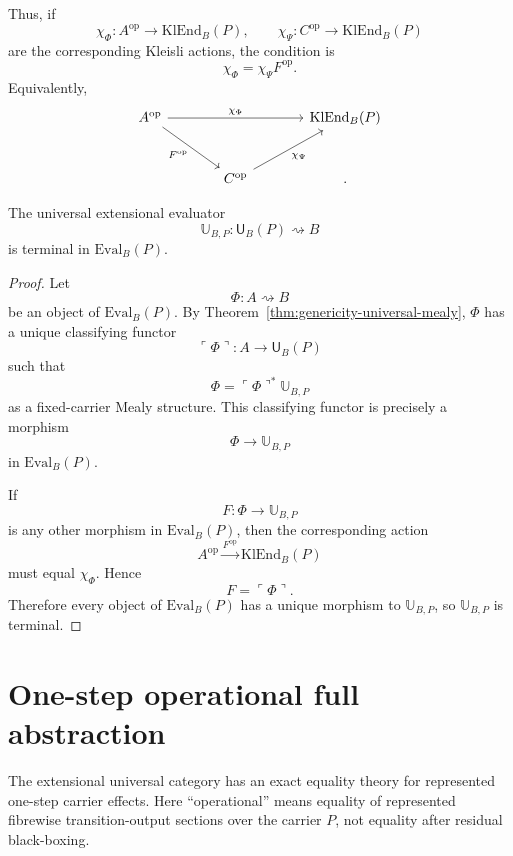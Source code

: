 Thus, if
\[
        \chi_\Phi:A^{\operatorname{op}}\to\mathrm{KlEnd}_B(P),
        \qquad
        \chi_\Psi:C^{\operatorname{op}}\to\mathrm{KlEnd}_B(P)
\]
are the corresponding Kleisli actions, the condition is
\[
        \chi_\Phi
        =
        \chi_\Psi F^{\operatorname{op}}.
\]
Equivalently,
\[
\begin{tikzcd}[column sep=large,row sep=large]
A^{\operatorname{op}}
\ar[rr,"\chi_\Phi"]
\ar[dr,swap,"F^{\operatorname{op}}"]
&
&
\mathrm{KlEnd}_B(P)
\\
&
C^{\operatorname{op}}
\ar[ur,swap,"\chi_\Psi"]
&
.
\end{tikzcd}
\]

\begin{theorem}
\label{thm:terminal-fixed-carrier-evaluator}
The universal extensional evaluator
\[
        \mathbb U_{B,P}:\mathsf U_B(P)\rightsquigarrow B
\]
is terminal in \(\mathrm{Eval}_B(P)\).
\end{theorem}

\begin{proof}
Let
\[
        \Phi:A\rightsquigarrow B
\]
be an object of \(\mathrm{Eval}_B(P)\).  By
Theorem~\ref{thm:genericity-universal-mealy}, \(\Phi\) has a unique classifying functor
\[
        \ulcorner\Phi\urcorner:A\to\mathsf U_B(P)
\]
such that
\[
        \Phi
        =
        \ulcorner\Phi\urcorner^{\ast}\mathbb U_{B,P}
\]
as a fixed-carrier Mealy structure.  This classifying functor is precisely a morphism
\[
        \Phi\longrightarrow \mathbb U_{B,P}
\]
in \(\mathrm{Eval}_B(P)\).

If
\[
        F:\Phi\to\mathbb U_{B,P}
\]
is any other morphism in \(\mathrm{Eval}_B(P)\), then the corresponding action
\[
        A^{\operatorname{op}}
        \xrightarrow{F^{\operatorname{op}}}
        \mathrm{KlEnd}_B(P)
\]
must equal \(\chi_\Phi\).  Hence
\[
        F=\ulcorner\Phi\urcorner.
\]
Therefore every object of \(\mathrm{Eval}_B(P)\) has a unique morphism to
\(\mathbb U_{B,P}\), so \(\mathbb U_{B,P}\) is terminal.
\end{proof}

\section{One-step operational full abstraction}
\label{sec:operational-full-abstraction}

The extensional universal category has an exact equality theory for represented one-step carrier
effects.  Here ``operational'' means equality of represented fibrewise transition-output sections
over the carrier \(P\), not equality after residual black-boxing.

